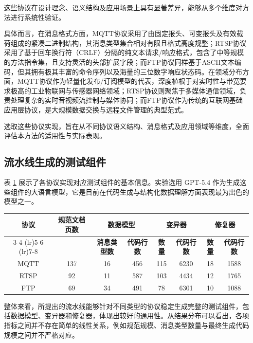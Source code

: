 这些协议在设计理念、语义结构及应用场景上具有显著差异，能够从多个维度对方法进行系统性验证。

具体而言，在消息格式方面，MQTT协议采用了由固定报头、可变报头及有效载荷组成的紧凑二进制结构，其消息类型集合相对有限且格式高度规整；RTSP协议采用了基于回车换行符（CRLF）分隔的纯文本请求/响应格式，包含了中等规模的方法指令集，且支持灵活的头部扩展字段；而FTP协议同样基于ASCII文本编码，但其拥有极其丰富的命令序列以及海量的三位数字响应状态码。在领域分布方面，MQTT协议作为轻量化发布/订阅模型的代表，深度植根于对实时性与带宽要求极高的工业物联网与传感器网络领域；RTSP协议则聚焦于多媒体通信领域，负责处理复杂的实时音视频流控制与媒体协同；而FTP协议作为传统的互联网基础应用层协议，是大规模数据交换与远程文件管理的典型范式。

选取这些协议实现，旨在从不同协议语义结构、消息格式及应用领域等维度，全面评估本方法的适用性与实际表现。

\subsection{流水线生成的测试组件}

表 \ref{tab:components} 展示了各协议实现对应测试组件的基本信息。实验选用 GPT-5.4 作为生成这些组件的大语言模型，它是目前在代码生成与结构化数据理解方面表现最为出色的模型之一。

\begin{table}[H]
\centering
{}
\label{tab:components}
\begin{tabular}{c c cc cc cc}
\toprule
\multirow{2}{*}{\textbf{协议}} 
& \multirow{2}{*}{\textbf{规范文档页数}} 
& \multicolumn{2}{c}{\textbf{数据模型}} 
& \multicolumn{2}{c}{\textbf{变异器}} 
& \multicolumn{2}{c}{\textbf{修复器}} \\ \cmidrule(lr){3-4}
\cmidrule(lr){5-6} \cmidrule(lr){7-8}
 & & \textbf{消息类型数} & \textbf{代码行数} & \textbf{数量} & \textbf{代码行数} & \textbf{数量} & \textbf{代码行数} \\
\midrule
MQTT  & 137 & 16  & 456 & 115 & 6230 & 18 & 1588 \\
RTSP  & 92  & 11  & 587 & 103 & 4434 & 12 & 1765 \\
FTP   & 69  & 34  & 491 & 78  & 6301 & 10 & 1088 \\
\bottomrule
\end{tabular}
\end{table}

整体来看，所提出的流水线能够针对不同类型的协议稳定生成完整的测试组件，包括数据模型、变异器和修复器，体现出较好的通用性。从结果分布可以看出，各项指标之间并不存在简单的线性关系，例如规范规模、消息类型数量与最终生成代码规模之间并不严格对应。

